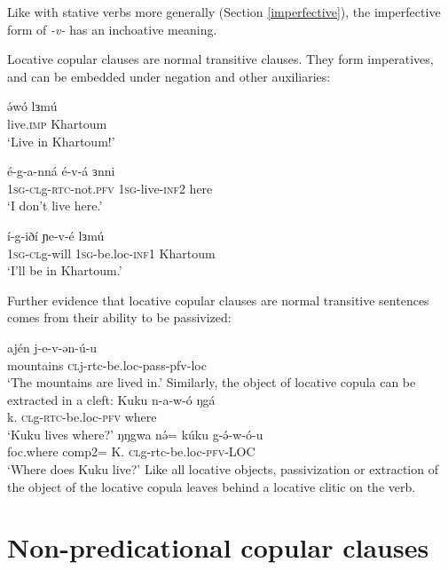Like with stative verbs more generally (Section \ref{imperfective}), the imperfective form of \textit{-v-} has an inchoative meaning.

Locative copular clauses are normal transitive clauses. They form imperatives, and can be embedded under negation and other auxiliaries:

\ea \gll 		ə́wó 		lɜmú\\      
				live.\textsc{imp}	Khartoum\\
	\glt 	‘Live in Khartoum!’ \z 

\ea 
\ea \gll  	é-g-a-nná			é-v-á				ɜnni 	\\
			\textsc{1\textsc{sg}}-\textsc{cl}g-\textsc{rtc}-not.\textsc{pfv}	1\textsc{sg}-live-\textsc{inf}2		here\\
	\glt	 	‘I don’t live here.’										

\ex \gll    í-g-iðí 		ɲe-v-é		lɜmú\\
	 		1\textsc{sg}-\textsc{cl}g-will	1\textsc{sg}-be.loc-\textsc{inf}1	Khartoum\\
	\glt  	‘I’ll be in Khartoum.’					\z 					
\z 

Further evidence that locative copular clauses are normal transitive sentences comes from their ability to be passivized:

\ea \gll  ajén j-e-v-ən-ú-u\\
			mountains \textsc{cl}j-rtc-be.loc-pass-pfv-loc\\
	\glt 		`The mountains are lived in.'
\z 
Similarly, the object of locative copula can be extracted in a cleft:
\ea
\ea \gll  	Kuku		n-a-w-ó	 		ŋgá \\ 
			k.		\textsc{cl}g-\textsc{rtc}-be.loc-\textsc{pfv}	where\\ 
	\glt  	‘Kuku lives where?’
\ex \gll  	ŋŋgwa		nə́=	    kúku 	g-ə́-w-ó-u			 	\\
			foc.where	comp2= K.		\textsc{cl}g-rtc-be.loc-\textsc{pfv}-LOC \\
	 \glt 	‘Where does Kuku live?’ 						\z 
\z 
Like all locative objects, passivization or extraction of the object of the locative copula leaves behind a locative clitic on the verb. %

\section{Non-predicational copular clauses}\label{section:nonpredcop}

